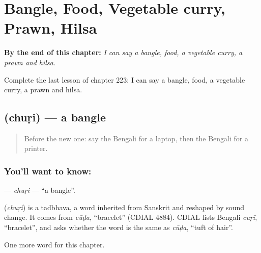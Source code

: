 
\chapter{Bangle, Food, Vegetable curry, Prawn, Hilsa}
\label{ch:bn-bangle-food-vegetable-curry-prawn-hilsa}

\begin{chapteropening}
\textbf{By the end of this chapter:} \emph{I can say a bangle, food, a vegetable curry, a prawn and hilsa.}

Complete the last lesson of chapter 223: I can say a bangle, food, a vegetable curry, a prawn and hilsa.
\end{chapteropening}

\section[\texorpdfstring{\bn{চুড়ি} (chuṛi)}{চুড়ি (chuṛi)}]{ (chuṛi) — a bangle}

\label{lesson:BN-C223-churi}



\begin{quote}
Before the new one: say the Bengali for a laptop, then the Bengali for a printer.
\end{quote}

\subsection*{You'll want to know: }
\textbf{} — \emph{chuṛi} — \textquotedblleft{}a bangle\textquotedblright{}.

\begin{cousinweb}
\textbf{} (\emph{chuṛi}) is a tadbhava, a word inherited from Sanskrit and reshaped by sound change. It comes from \emph{cūḍa}, \textquotedblleft{}bracelet\textquotedblright{} (CDIAL 4884). CDIAL lists Bengali \emph{cuṛī}, \textquotedblleft{}bracelet\textquotedblright{}, and asks whether the word is the same as \emph{cūḍa}, \textquotedblleft{}tuft of hair\textquotedblright{}.
\end{cousinweb}

\begin{grammarlens}[title={What you've built}]
One more word for this chapter.
\end{grammarlens}


